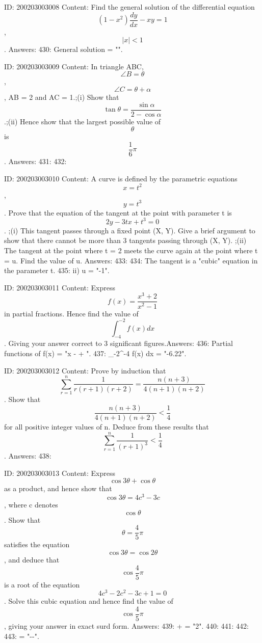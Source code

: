 \documentclass{article}
\begin{document}
ID: 200203003008
Content:
Find the general solution of the differential equation  $$(1 - x^2)\frac{dy}{dx}- xy = 1$$,  $$| x | < 1$$. Answers:
430: General solution = "".

ID: 200203003009
Content:
In triangle ABC,  $$\angle B = \theta $$,  $$\angle C = \theta  + \alpha $$, AB = 2 and AC = 1.;(i) Show that  $$\tan \theta  = \frac{\sin \alpha}{2 - \cos \alpha}$$.;(ii) Hence show that the largest possible value of  $$\theta $$ is  $$\frac{1}{6}\pi $$. Answers:
431: 
432: 

ID: 200203003010
Content:
A curve is defined by the parametric equations  $$x = t^2 $$,  $$y = t^3 $$. Prove that the equation of the tangent at the point with parameter t is  $$2y - 3tx + t^3  = 0$$. ;(i) This tangent passes through a fixed point (X, Y). Give a brief argument to show that there cannot be more than 3 tangents passing through (X, Y). ;(ii) The tangent at the point where t = 2 meets the curve again at the point where t = u. Find the value of u. Answers:
433: 
434: The tangent is a "cubic" equation in the parameter t.
435: ii) u = "-1".

ID: 200203003011
Content:
Express  $$f(x) = \frac{x^3+2}{x^2-1}$$ in partial fractions. Hence find the value of  $$\int_{-4}^{-2} f(x)dx $$. Giving your answer correct to 3 significant figures.Answers:
436: Partial functions of f(x) = "x -  + ".
437: \int_{-2}^{-4} f(x) dx = "-6.22".

ID: 200203003012
Content:
Prove by induction that  $$\sum_{r = 1}^{n} \frac{1}{r( r + 1 )( r + 2 )}  = \frac{n( n + 3 )}{4( n + 1 )( n + 2 )}$$. Show that  $$\frac{n( n + 3 )}{4( n + 1 )( n + 2 )} < \frac{1}{4}$$ for all positive integer values of n. Deduce from these results that  $$\sum_{r = 1}^{n} \frac{1}{( r + 1 )^3} < \frac{1}{4}$$. Answers:
438: 

ID: 200203003013
Content:
Express  $$\cos 3\theta  + \cos \theta $$ as a product, and hence show that  $$\cos 3\theta  = 4c^3  - 3c$$, where c denotes  $$\cos \theta $$. Show that  $$\theta  = \frac{4}{5}\pi $$ satisfies the equation  $$\cos 3\theta  = \cos 2\theta $$, and deduce that  $$\cos \frac{4}{5}\pi $$ is a root of the equation  $$4c^3  - 2c^2  - 3c + 1 = 0$$. Solve this cubic equation and hence find the value of  $$\cos \frac{4}{5}\pi$$, giving your answer in exact surd form. Answers:
439: \theta  + \cos \theta  = "2\cos{2\theta}\cos{\theta}".
440: 
441: 
442: 
443: \cos {}\pi = "--".
\end{document}
